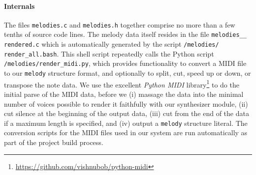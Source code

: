 \documentclass[a4paper,9pt]{article}
\newcommand{\isrc}[1]{\texttt{#1}}
\begin{document}
\paragraph{Internals}
The files \texttt{melodies.c} and \texttt{melodies.h} together comprise no
more than a few tenths of source code lines. The melody data itself resides in
the file \texttt{melodies\_\_ rendered.c} which is automatically generated by
the script \texttt{/melodies/ render\_all.bash}. This shell script
repeatedly calls the Python script \texttt{/melodies/render\_midi.py}, which
provides functionality to convert a MIDI file to our \isrc{melody} structure
format, and optionally to split, cut, speed up or down, or transpose the note
data.  We use the excellent \emph{Python MIDI}
library\footnote{\url{https://github.com/vishnubob/python-midi}} to do the
initial parse of the MIDI data, before we (i) massage the data into the
minimal number of voices possible to render it faithfully with our synthesizer
module, (ii) cut silence at the beginning of the output data, (iii) cut from
the end of the data if a maximum length is specified, and (iv) output
a \isrc{melody} structure literal. 
The conversion scripts for the MIDI files used in our system are run
automatically as part of the project build process.
\end{document}
